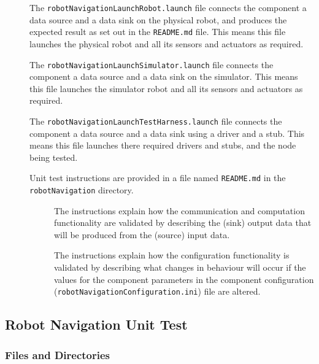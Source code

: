 \documentclass{CSSRforAfrica}
\newcommand{\checkboxChecked}{\fbox{\ding{51}}} %
\newcommand{\checkboxDashed}{\fbox{--}}         %
\begin{document}
\begin{description}
\item[\checkboxDashed] The {\small \verb+robotNavigationLaunchRobot.launch+} file  connects the component a data source and a data sink on the physical robot, and produces the expected result as set out in the  \small {\texttt{README.md}}   file.    This means this file launches the physical robot and all its sensors and actuators as required.

\item[\checkboxDashed] The {\small \verb+robotNavigationLaunchSimulator.launch+} file  connects the component a data source and a data sink on the simulator.    This means this file launches the simulator robot and all its sensors and actuators as required.

\item[\checkboxDashed] The {\small \verb+robotNavigationLaunchTestHarness.launch+} file  connects the component a data source and a data sink using a driver and a stub.   This means this file launches there required drivers and stubs, and the node being tested.

\item[\checkboxChecked] Unit test instructions are provided in a file named {\small \verb+README.md+} in the {\small \verb+robotNavigation+} directory.

\begin{description}

\item[\checkboxChecked] The instructions  explain how the  communication and computation functionality are validated by describing the (sink) output data that will be produced from the (source) input data.  

\item[\checkboxChecked] The instructions  explain how the  configuration functionality is validated by describing what changes in behaviour will occur if the values for the component parameters in the component configuration ({\small \verb+robotNavigationConfiguration.ini+}) file are altered.

\end{description}

\end{description}

\subsection{Robot Navigation Unit Test}

\subsubsection{Files and Directories}
\end{document}
